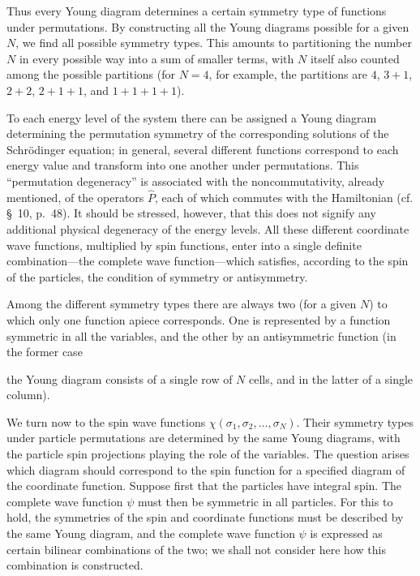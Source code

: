 Thus every Young diagram determines a certain symmetry type of functions under permutations. By constructing all the Young diagrams possible for a given $N$, we find all possible symmetry types. This amounts to partitioning the number $N$ in every possible way into a sum of smaller terms, with $N$ itself also counted among the possible partitions (for $N=4$, for example, the partitions are $4$, $3+1$, $2+2$, $2+1+1$, and $1+1+1+1$).

To each energy level of the system there can be assigned a Young diagram determining the permutation symmetry of the corresponding solutions of the Schrödinger equation; in general, several different functions correspond to each energy value and transform into one another under permutations. This ``permutation degeneracy'' is associated with the noncommutativity, already mentioned, of the operators $\widehat P$, each of which commutes with the Hamiltonian (cf. §~10, p.~48). It should be stressed, however, that this does not signify any additional physical degeneracy of the energy levels. All these different coordinate wave functions, multiplied by spin functions, enter into a single definite combination---the complete wave function---which satisfies, according to the spin of the particles, the condition of symmetry or antisymmetry.

Among the different symmetry types there are always two (for a given $N$) to which only one function apiece corresponds. One is represented by a function symmetric in all the variables, and the other by an antisymmetric function (in the former case

the Young diagram consists of a single row of $N$ cells, and in the latter of a single column).

We turn now to the spin wave functions $\chi(\sigma_1,\sigma_2,\ldots,\sigma_N)$. Their symmetry types under particle permutations are determined by the same Young diagrams, with the particle spin projections playing the role of the variables. The question arises which diagram should correspond to the spin function for a specified diagram of the coordinate function. Suppose first that the particles have integral spin. The complete wave function $\psi$ must then be symmetric in all particles. For this to hold, the symmetries of the spin and coordinate functions must be described by the same Young diagram, and the complete wave function $\psi$ is expressed as certain bilinear combinations of the two; we shall not consider here how this combination is constructed.

